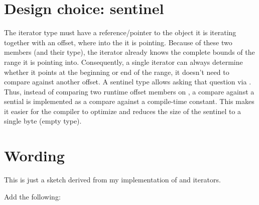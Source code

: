 \section{Design choice: sentinel}

The \simd iterator type must have a reference/pointer to the \simd object it is iterating together
with an offset, where into the \simd it is pointing.
Because of these two members (and their type), the iterator already knows the complete bounds of the
range it is pointing into.
Consequently, a single \simd iterator can always determine whether it points at the beginning or end
of the range, it doesn't need to compare against another offset.
A sentinel type allows asking that question via .
Thus, instead of comparing two runtime offset members on , a compare against a
sential is implemented as a compare against a compile-time constant.
This makes it easier for the compiler to optimize and reduces the size of the  sentinel
to a single byte (empty type).

\section{Wording}

This is just a sketch derived from my implementation of \simd and \mask iterators.

Add the following:

